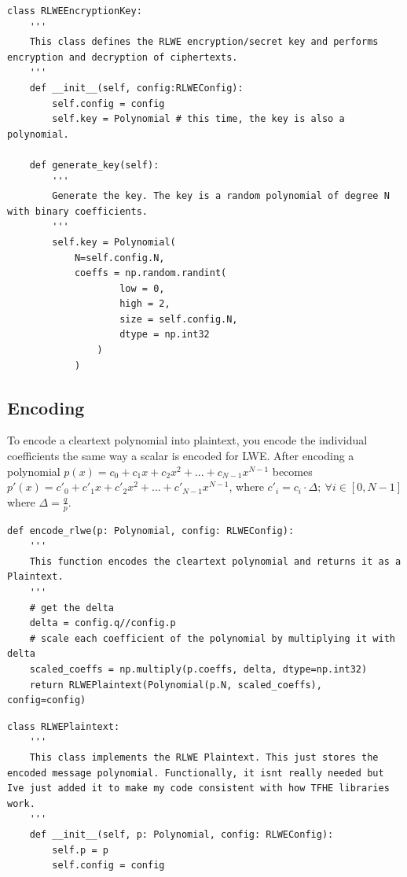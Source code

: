 \documentclass{report}
\begin{document}
\begin{verbatim}
class RLWEEncryptionKey:
	'''
	This class defines the RLWE encryption/secret key and performs encryption and decryption of ciphertexts.
	'''
	def __init__(self, config:RLWEConfig):
		self.config = config
		self.key = Polynomial # this time, the key is also a polynomial.
		
	def generate_key(self):
		'''
		Generate the key. The key is a random polynomial of degree N with binary coefficients.
		'''
		self.key = Polynomial(
			N=self.config.N,
			coeffs = np.random.randint(
					low = 0,
					high = 2,
					size = self.config.N,
					dtype = np.int32
				)
			)
\end{verbatim}
		
		\subsection{Encoding}
			To encode a cleartext polynomial into plaintext, you encode the individual coefficients the same way a scalar is encoded for LWE. After encoding a polynomial $p(x) = c_0 + c_1x + c_2x^2 + ... + c_{N-1}x^{N-1}$ becomes $p'(x) = c'_0 + c'_1x + c'_2x^2 + ... + c'_{N-1}x^{N-1}$, where $c'_i = c_i \cdot \Delta; \: \forall i \in [0, N-1]$ where $\Delta = \frac{q}{p}$.
\begin{verbatim}
def encode_rlwe(p: Polynomial, config: RLWEConfig):
	'''
	This function encodes the cleartext polynomial and returns it as a Plaintext.
	'''
	# get the delta
	delta = config.q//config.p
	# scale each coefficient of the polynomial by multiplying it with delta
	scaled_coeffs = np.multiply(p.coeffs, delta, dtype=np.int32)
	return RLWEPlaintext(Polynomial(p.N, scaled_coeffs), config=config)
\end{verbatim}

\begin{verbatim}
class RLWEPlaintext:
	'''
	This class implements the RLWE Plaintext. This just stores the encoded message polynomial. Functionally, it isnt really needed but Ive just added it to make my code consistent with how TFHE libraries work.
	'''
	def __init__(self, p: Polynomial, config: RLWEConfig):
		self.p = p
		self.config = config
\end{verbatim}
			
\end{document}
